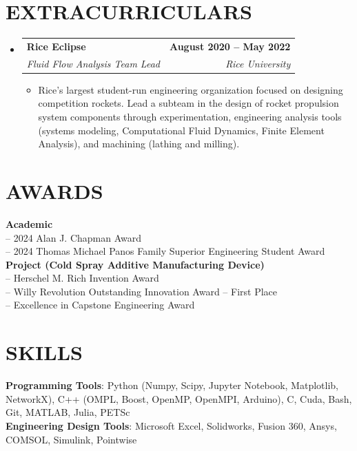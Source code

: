 \documentclass[letterpaper,11pt]{article}
\makeatletter
\newcommand{\resumeItem}[1]{
  \item \small{
    {#1 \vspace{-2pt}}
  }
}
\newcommand{\resumeSubheading}[4]{
  \vspace{-2pt}\item
    \begin{tabular*}{1.0\textwidth}[t]{l@{\extracolsep{\fill}}r}
      \textbf{#1} & \textbf{\small #2} \\
      \textit{\small#3} & \textit{\small #4} \\
    \end{tabular*}\vspace{-7pt}
}
\newcommand{\resumeSubHeadingListStart}{\begin{itemize}[leftmargin=0.0in, label={}]}
\newcommand{\resumeSubHeadingListEnd}{\end{itemize}}
\newcommand{\resumeItemListStart}{\begin{itemize}}
\newcommand{\resumeItemListEnd}{\end{itemize}\vspace{-5pt}}
\makeatother
\begin{document}
\section{EXTRACURRICULARS}
    
    \resumeSubHeadingListStart
        
        \resumeSubheading{Rice Eclipse}{August 2020 -- May 2022}{Fluid Flow Analysis Team Lead}{Rice University}
          \resumeItemListStart
             \resumeItem{Rice's largest student-run engineering organization focused on designing competition rockets. Lead a subteam in the design of rocket propulsion system components through experimentation, engineering analysis tools (systems modeling, Computational Fluid Dynamics, Finite Element Analysis), and machining (lathing and milling).}
          \resumeItemListEnd   
        
    \resumeSubHeadingListEnd
\vspace{-16pt}

\section{AWARDS}
 \begin{itemize}[leftmargin=0.15in, label={}]
    \small{\item{
     \textbf{Academic} \\
     {-- 2024 Alan J. Chapman Award} \\
     {-- 2024 Thomas Michael Panos Family Superior Engineering Student Award} \\
     \vspace{2pt}
     \textbf{Project (Cold Spray Additive Manufacturing Device)} \\
     {-- Herschel M. Rich Invention Award} \\
     {-- Willy Revolution Outstanding Innovation Award -- First Place}\\ 
     {-- Excellence in Capstone Engineering Award} \\
    }}
 \end{itemize}
 \vspace{-16pt}

\section{SKILLS}
 \begin{itemize}[leftmargin=0.15in, label={}]
    \small{\item{
     \textbf{Programming Tools}{: Python (Numpy, Scipy, Jupyter Notebook, Matplotlib, NetworkX), C++ (OMPL, Boost, OpenMP, OpenMPI, Arduino), C, Cuda, Bash, Git, MATLAB, Julia, PETSc} \\
     \textbf{Engineering Design Tools}{: Microsoft Excel, Solidworks, Fusion 360, Ansys, COMSOL, Simulink, Pointwise} \\
    }}
 \end{itemize}
 \vspace{-16pt}
\end{document}

